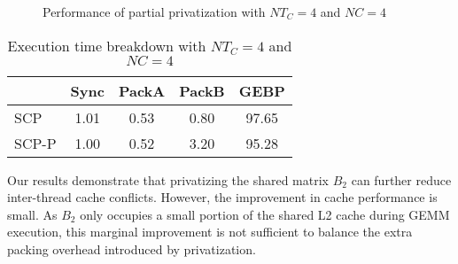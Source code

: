 \begin{figure}
  \centering
  \caption{Performance of partial privatization with $NT_C=4$ and $NC=4$}
  \label{fig:privb}
\end{figure}

\begin{table}
  \centering
  \caption{Execution time breakdown with $NT_C=4$ and $NC=4$}
  \label{tab:breakdown}
  \setlength{\tabcolsep}{3.5pt}
  \begin{tabular}{lcccc}
    \toprule
     & Sync & PackA & PackB & GEBP\\
    \midrule
    SCP   & 1.01 & 0.53 & 0.80 & 97.65 \\
    SCP-P & 1.00 & 0.52 & 3.20 & 95.28\\
    \bottomrule
  \end{tabular}
\end{table}


Our results demonstrate that privatizing the shared matrix $B_2$ can further
reduce inter-thread cache conflicts.
However, the improvement in cache performance is small.
As $B_2$ only occupies a small portion of the shared L2 cache during GEMM execution,
this marginal improvement is not sufficient to
balance the extra packing overhead introduced
by privatization.
